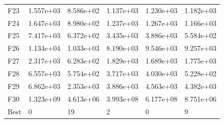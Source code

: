 \begin{tabular}{llllll}
F23  &  1.557e+03 &  8.586e+02 &  1.137e+03 &  1.230e+03 &  1.182e+03 \\
F24  &  1.647e+03 &  8.980e+02 &  1.237e+03 &  1.267e+03 &  1.166e+03 \\
F25  &  7.417e+03 &  6.372e+02 &  3.435e+03 &  3.886e+03 &  5.584e+02 \\
F26  &  1.134e+04 &  1.033e+03 &  8.190e+03 &  9.546e+03 &  9.257e+03 \\
F27  &  2.317e+03 &  6.283e+02 &  1.829e+03 &  1.689e+03 &  1.775e+03 \\
F28  &  6.557e+03 &  5.754e+02 &  3.717e+03 &  4.030e+03 &  5.228e+02 \\
F29  &  6.862e+03 &  2.353e+03 &  3.886e+03 &  4.563e+03 &  4.382e+03 \\
F30  &  1.323e+09 &  4.613e+06 &  3.993e+08 &  6.177e+08 &  8.751e+06 \\
Best &          0 &         19 &          2 &          0 &          9 \\
\bottomrule
\end{tabular}
